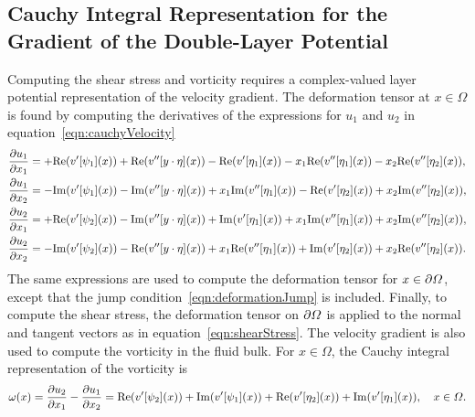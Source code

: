 \documentclass{jfm}
\begin{document}
\subsection{Cauchy Integral Representation for the Gradient of the
Double-Layer Potential}
\label{sec:gradDLPcomplex}
Computing the shear stress and vorticity requires a complex-valued layer
potential representation of the velocity gradient.  The deformation
tensor at $x \in \Omega$ is found by computing the derivatives of the
expressions for $u_1$ and $u_2$ in equation~\eqref{eqn:cauchyVelocity}  
\begin{equation}
\label{eqn:cauchyGradient}
  \begin{aligned}
    \frac{\partial u_1}{\partial x_1} &= +{\operatorname{Re}} (v'[\psi_1](x)) + 
      {\operatorname{Re}} (v''[y\cdot\eta](x)) - {\operatorname{Re}} (v'[\eta_1](x)) - 
      x_1{\operatorname{Re}} (v''[\eta_1](x)) - x_2{\operatorname{Re}} (v''[\eta_2](x)), \\
    \frac{\partial u_1}{\partial x_2} &= - {\operatorname{Im}} (v'[\psi_1](x)) - 
      {\operatorname{Im}} (v''[y\cdot\eta](x)) + x_1{\operatorname{Im}} (v''[\eta_1](x)) - 
      {\operatorname{Re}} (v'[\eta_2](x)) + x_2{\operatorname{Im}} (v''[\eta_2](x)), \\
    \frac{\partial u_2}{\partial x_1} &= +{\operatorname{Re}} (v'[\psi_2](x)) - 
      {\operatorname{Im}} (v''[y\cdot\eta](x)) + {\operatorname{Im}} (v'[\eta_1](x)) +
      x_1{\operatorname{Im}} (v''[\eta_1](x)) + x_2{\operatorname{Im}} (v''[\eta_2](x)), \\
    \frac{\partial u_2}{\partial x_2} &= -{\operatorname{Im}} (v'[\psi_2](x)) - 
      {\operatorname{Re}} (v''[y\cdot\eta](x)) + x_1{\operatorname{Re}} (v''[\eta_1](x)) +
      {\operatorname{Im}} (v'[\eta_2](x)) + x_2{\operatorname{Re}} (v''[\eta_2](x)).
  \end{aligned}
\end{equation}
The same expressions are used to compute the deformation tensor for $x
\in {\partial}\varOmega$, except that the jump
condition~\eqref{eqn:deformationJump} is included.  Finally, to compute
the shear stress, the deformation tensor on ${\partial}\varOmega$ is applied to
the normal and tangent vectors as in equation~\eqref{eqn:shearStress}.
The velocity gradient is also used to compute the vorticity in the fluid
bulk.  For $x \in \Omega$, the Cauchy integral representation of the
vorticity is
\begin{align}
  \omega(x) = \frac{\partial u_2}{\partial x_1} - \frac{\partial u_1}{\partial x_2} = 
{\operatorname{Re}} (v'[\psi_2](x)) + {\operatorname{Im}} (v'[\psi_1](x)) 
 + {\operatorname{Re}} (v'[\eta_2](x))+ {\operatorname{Im}} (v'[\eta_1](x)), \quad x \in \varOmega.
\end{align}


\end{document}
